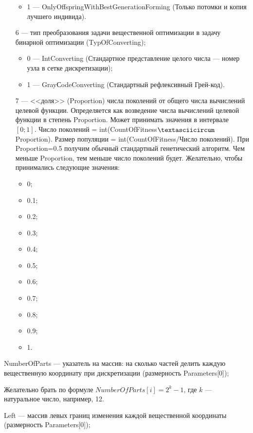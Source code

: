 \begin{itemize}
\begin{itemize}
       \item 1 --- OnlyOffspringWithBestGenerationForming (Только потомки и копия лучшего индивида).
	    \end{itemize}
 \item [6] --- тип преобразования задачи вещественной оптимизации в задачу бинарной оптимизации (TypOfConverting);
   \begin{itemize}
        \item 0 --- IntConverting (Стандартное представление целого числа –-- номер узла в сетке дискретизации);
        \item 1 --- GrayСodeConverting (Стандартный рефлексивный Грей-код).
			    \end{itemize}
				
 \item [7] --- <<доля>> (Proportion) числа поколений от общего числа вычислений целевой функции. Определяется как возведение числа вычислений целевой функции в степень Proportion. Может принимать значения в интервале $[0;1]$. Число поколений = int(CountOfFitness$\textasciicircum$Proportion). Размер популяции = int(CountOfFitness/Число поколений). При Proportion=0.5 получим обычный стандартный генетический алгоритм. Чем меньше Proportion, тем меньше число поколений будет. Желательно, чтобы принимались следующие значения:
  \begin{itemize}
       \item 0;
	   \item 0.1;
	   \item 0.2;
	   \item 0.3;
	   \item 0.4;
	   \item 0.5;
	   \item 0.6;
	   \item 0.7;
	   \item 0.8;
	   \item 0.9; 
       \item 1.
	    \end{itemize}
 \end{itemize}
 
 NumberOfParts --- указатель на массив: на сколько частей делить каждую вещественную координату при дискретизации (размерность Parameters[0]);
 
  Желательно брать по формуле $NumberOfParts[i]=2^k-1$, где $k$ --- натуральное число, например, 12.
  
 Left --- массив левых границ изменения каждой вещественной координаты (размерность Parameters[0]);
 
